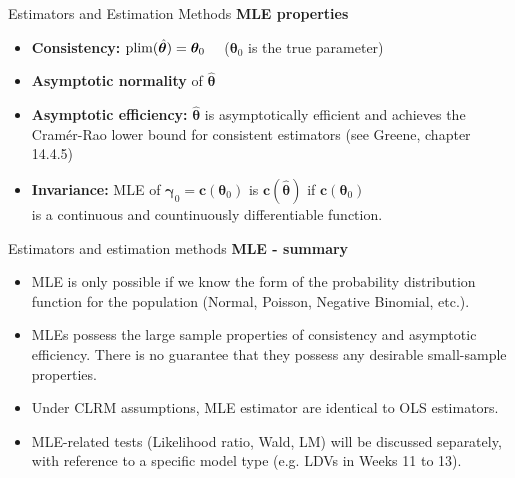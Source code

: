 \documentclass{beamer}
\begin{document}
\begin{frame}{Estimators and Estimation Methods}
\textbf{MLE properties}\\
\begin{itemize}
    \item \textbf{Consistency:} $\textnormal{plim}(\hat{\bm{\theta}}) = \bm{\theta}_0$ ~~($\bm{\theta}_0$ is the true parameter)
    \medskip
    \item \textbf{Asymptotic normality} of $\bm{\hat{\theta}}$
    \medskip
    \item \textbf{Asymptotic efficiency:}  $\bm{\hat{\theta}}$ is asymptotically efficient and achieves the Cramér-Rao lower bound for consistent estimators (see Greene, chapter 14.4.5)
    \medskip
    \item \textbf{Invariance:} MLE of $\bm{\gamma}_0=\bm{c}(\bm{\theta}_0)$ is $\bm{c}(\bm{\hat{\theta}})$ if $\bm{c}(\bm{\theta}_0)$ \\is a continuous and countinuously differentiable function.
\end{itemize}
\end{frame}
\begin{frame}{Estimators and estimation methods}
\textbf{MLE - summary}\\
\begin{itemize}
\item MLE is only possible if we know the form of the probability distribution function for the population (Normal, Poisson, Negative Binomial, etc.).
\medskip
\item MLEs possess the large sample properties of consistency and asymptotic efficiency. There is no guarantee that they possess any desirable small-sample properties. 
\medskip
\item Under CLRM assumptions, MLE estimator are identical to OLS estimators.
\medskip
\item MLE-related tests (Likelihood ratio, Wald, LM) will be discussed separately, with reference to a specific model type (e.g. LDVs in Weeks 11 to 13).
\end{itemize}
\end{frame}
\end{document}
